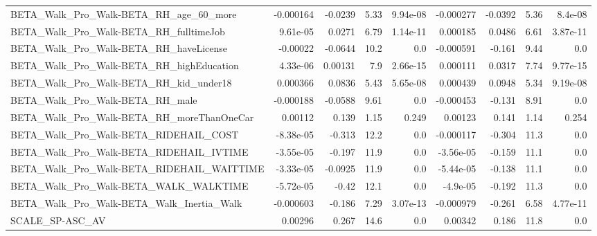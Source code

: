 \begin{tabular}{lrrrrrrrr}
BETA\_Walk\_Pro\_Walk-BETA\_RH\_age\_60\_more             &   -0.000164 &      -0.0239 &     5.33 & 9.94e-08 &  -0.000277 &     -0.0392 &         5.36 &       8.4e-08 \\
BETA\_Walk\_Pro\_Walk-BETA\_RH\_fulltimeJob             &    9.61e-05 &       0.0271 &     6.79 & 1.14e-11 &   0.000185 &      0.0486 &         6.61 &      3.87e-11 \\
BETA\_Walk\_Pro\_Walk-BETA\_RH\_haveLicense             &    -0.00022 &      -0.0644 &     10.2 &      0.0 &  -0.000591 &      -0.161 &         9.44 &           0.0 \\
BETA\_Walk\_Pro\_Walk-BETA\_RH\_highEducation           &    4.33e-06 &      0.00131 &      7.9 & 2.66e-15 &   0.000111 &      0.0317 &         7.74 &      9.77e-15 \\
BETA\_Walk\_Pro\_Walk-BETA\_RH\_kid\_under18             &    0.000366 &       0.0836 &     5.43 & 5.65e-08 &   0.000439 &      0.0948 &         5.34 &      9.19e-08 \\
BETA\_Walk\_Pro\_Walk-BETA\_RH\_male                    &   -0.000188 &      -0.0588 &     9.61 &      0.0 &  -0.000453 &      -0.131 &         8.91 &           0.0 \\
BETA\_Walk\_Pro\_Walk-BETA\_RH\_moreThanOneCar          &     0.00112 &        0.139 &     1.15 &    0.249 &    0.00123 &       0.141 &         1.14 &         0.254 \\
BETA\_Walk\_Pro\_Walk-BETA\_RIDEHAIL\_COST              &   -8.38e-05 &       -0.313 &     12.2 &      0.0 &  -0.000117 &      -0.304 &         11.3 &           0.0 \\
BETA\_Walk\_Pro\_Walk-BETA\_RIDEHAIL\_IVTIME            &   -3.55e-05 &       -0.197 &     11.9 &      0.0 &  -3.56e-05 &      -0.159 &         11.1 &           0.0 \\
BETA\_Walk\_Pro\_Walk-BETA\_RIDEHAIL\_WAITTIME          &   -3.33e-05 &      -0.0925 &     11.9 &      0.0 &  -5.44e-05 &      -0.138 &         11.1 &           0.0 \\
BETA\_Walk\_Pro\_Walk-BETA\_WALK\_WALKTIME              &   -5.72e-05 &        -0.42 &     12.1 &      0.0 &   -4.9e-05 &      -0.192 &         11.3 &           0.0 \\
BETA\_Walk\_Pro\_Walk-BETA\_Walk\_Inertia\_Walk          &   -0.000603 &       -0.186 &     7.29 & 3.07e-13 &  -0.000979 &      -0.261 &         6.58 &      4.77e-11 \\
SCALE\_SP-ASC\_AV                                    &     0.00296 &        0.267 &     14.6 &      0.0 &    0.00342 &       0.186 &         11.8 &           0.0 \\

\end{tabular}
